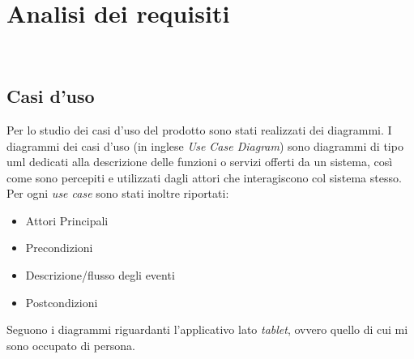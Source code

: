 \chapter{Analisi dei requisiti}
\label{cap:analisi-requisiti}

\\

\section{Casi d'uso}

Per lo studio dei casi d'uso del prodotto sono stati realizzati dei diagrammi.
I diagrammi dei casi d'uso (in inglese \emph{Use Case Diagram}) sono diagrammi di tipo \gls{uml} dedicati alla descrizione delle funzioni o servizi offerti da un sistema, così come sono percepiti e utilizzati dagli attori che interagiscono col sistema stesso.
Per ogni \emph{use case} sono stati inoltre riportati:
\begin{itemize}
	\item Attori Principali
	\item Precondizioni
	\item Descrizione/flusso degli eventi
	\item Postcondizioni
\end{itemize}
Seguono i diagrammi riguardanti l'applicativo lato \emph{tablet}, ovvero quello di cui mi sono occupato di persona.


